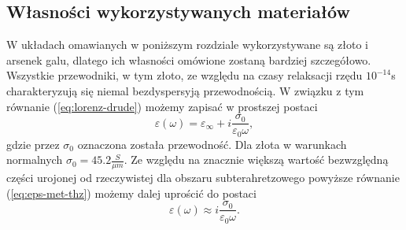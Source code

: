 \subsection{Własności wykorzystywanych materiałów}
W układach omawianych w poniższym rozdziale wykorzystywane są złoto i arsenek galu, dlatego ich własności omówione zostaną bardziej szczegółowo. Wszystkie przewodniki, w tym złoto, ze względu na czasy relaksacji rzędu $10^{-14}$s charakteryzują się niemal bezdyspersyją przewodnością. W związku z tym równanie (\ref{eq:lorenz-drude}) możemy zapisać w prostszej postaci
\begin{equation}
	\varepsilon(\omega)=\varepsilon_{\infty}+i \frac{\sigma_0}{\varepsilon_0 \omega},
	\label{eq:eps-met-thz}
\end{equation}
gdzie przez $\sigma_0$ oznaczona została przewodność. Dla złota w warunkach normalnych $\sigma_0=45.2 \frac{S}{\mu m}$.   Ze względu na znacznie większą wartość bezwzględną części urojonej od rzeczywistej dla obszaru subterahretzowego powyższe równanie (\ref{eq:eps-met-thz}) możemy dalej uprościć do postaci
\begin{equation}
	\varepsilon(\omega) \approx i \frac{\sigma_0}{\varepsilon_0 \omega}.
	\label{eq:eps-met-thz-app}
\end{equation}

